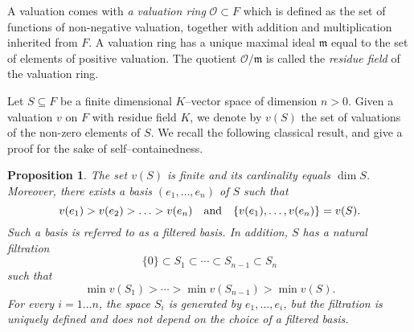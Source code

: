 \documentclass{article}
\theoremstyle{plain}
\newtheorem{prop}[thm]{Proposition}
\theoremstyle{definition}
\theoremstyle{remark}
\def\OO{\mathcal{O}}
\def\m{\mathfrak m}
\begin{document}


A valuation comes with {\em
  a valuation ring} $\OO \subset F$ {which is defined
  as the set of functions of non-negative valuation, together with
  addition and multiplication inherited from $F$.
  A valuation ring has a unique maximal ideal $\m$ equal to the set of
  elements of positive valuation. The quotient $\OO/\m$ is called the
  {\em residue field} of the valuation ring.}


Let $S \subseteq F$ be a finite dimensional $K$--vector space of
dimension $n>0$.  Given a valuation $v$ on $F$ with residue field $K$,
we denote by $v(S)$ the set of valuations of the non-zero elements of $S$. We
recall the following classical result, and give a proof for the sake
of self--containedness.

\begin{prop}\label{prop:filtered_basis}
  The set $v(S)$ is finite and its cardinality equals $\dim S$.
  Moreover, there exists a basis $(e_1, \ldots, e_n)$ of $S$ such that
  $$v(e_1) > v(e_2) > \ldots > v(e_n) \quad {\rm and} \quad
  \{v(e_1), \ldots, v(e_n)\} = v(S).$$ Such a basis is referred to as
  a {\em filtered basis}. {
    In addition, $S$ has a natural filtration
  $$
  \{0\} \subset S_1 \subset \cdots \subset S_{n-1} \subset S_n
  $$
  such that
  \begin{equation}\label{eq:ineq_valuations}
  \min v(S_1) > \cdots > \min v(S_{n-1}) > \min v (S).
  \end{equation}
  For every $i=1\ldots n$, the space $S_i$ is generated by $e_1,\ldots
  ,e_i$, but the filtration is uniquely defined and does not depend on the choice of a filtered basis.
  }
\end{prop}
\end{document}
